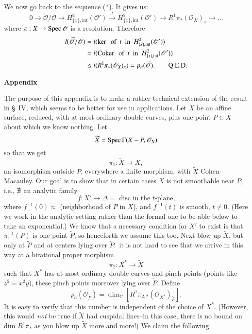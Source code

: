 We now go back to the sequence (*). It gives us:
$$
0\to \widetilde{\mathscr{O}}/\mathscr{O}\to
H^{2}_{\{x\},\text{int}}(\mathscr{O}')\xrightarrow{t}H^{2}_{\{x\},\text{int}}(\mathscr{O}')\to
R^{1}\pi_{*}(\mathscr{O}_{X})_{x}\to\ldots 
$$
where $\pi:X\to \operatorname{Spec} \mathscr{O}$ is a resolution. Therefore
\begin{align*}
l(\widetilde{\mathscr{O}}/\mathscr{O}) &= l(\ker \text{~ of~ }
t\text{~ in~ } H^{2}_{\{x\},\text{int}}(\mathscr{O}'))\\
&=l(\operatorname{Coker} \text{~ of~ } t\text{~ in~
}H^{2}_{\{x\},\text{int}}(\mathscr{O}'))\\
&\leq l(R^{1}\pi_{*}(\mathscr{O}_{X})_{x})=p_{a}(\widetilde{\mathscr{O}}).\tag*{Q.E.D.}
\end{align*}

\appendix

\begin{center}
{\large\bf Appendix}\pageoriginale
\end{center}

The purpose of this appendix is to make a rather technical extension
of the result in \S\ IV, which seems to be better for use in
applications. Let $X$ be an affine surface, reduced, with at most
ordinary double curves, plus one point $P\in X$ about which we know
nothing. Let 
$$
\widetilde{X}=\operatorname{Spec} \Gamma(X-P,\mathscr{O}_{X})
$$
so that we get
$$
\pi_{1}:\widetilde{X}\to X,
$$
an isomorphism outside $P$, everywhere a finite morphism, with
$\widetilde{X}$ Cohen-Macauley. Our goal is to show that in certain
cases $X$ is not smoothable near $P$, i.e., $\not\exists$ an analytic
family
$$
f:X'\to \Delta=\text{~disc in the $t$-plane,}
$$
where $f^{-1}(0)\approx$ (neighborhood of $P$ in $X$), and $f^{-1}(t)$
is smooth, $t\neq 0$. (Here we work in the analytic setting rather
than the formal one to be able below to take an exponential.) We know
that a necessary condition for $X'$ to exist is that $\pi^{-1}_{1}(P)$
is one point $\widetilde{P}$, so henceforth we assume this too. Next
blow up $\widetilde{X}$, but only at $\widetilde{P}$ and at centers
lying over $\widetilde{P}:$ it is not hard to see that we arrive in
this way at a birational proper morphism
$$
\pi_{2}:X^{*}\to \widetilde{X}
$$
such that $X^{*}$ has at most ordinary double curves and pinch points
(points like $z^{2}=x^{2}y$), these pinch points moreover lying over
$\widetilde{P}$. Define
$$
p_{a}(\mathscr{O}_{\widetilde{P}})=\dim_{C}[R^{1}\pi_{2,*}(\mathscr{O}_{X^{*}})_{\widetilde{P}}].
$$
It is easy to verify that this number is independent of the choice of
$X^{*}$. (However, this would {\em not} be true if $\widetilde{X}$ had
cuspidal lines--in this case, there is no bound on dim $R^{1}\pi_{*}$
as you blow up $\widetilde{X}$ more and more!) We claim the following

